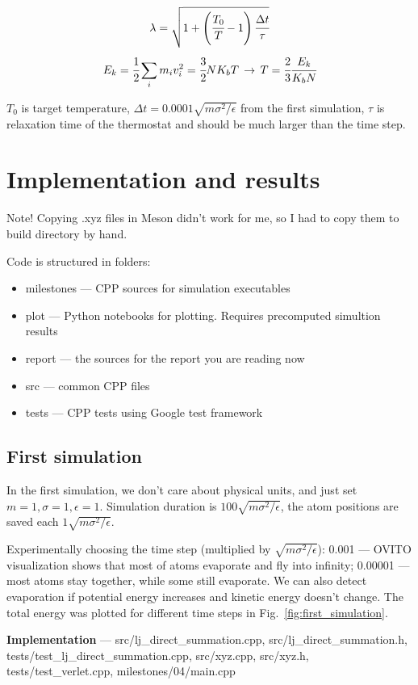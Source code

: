 \documentclass[12pt,a4paper]{article}
\newcommand{\infers}{\,\to\,}
\begin{document}
\[ \lambda = \sqrt{1 + \left(\cfrac{T_0}{T}-1 \right) \cfrac{\Delta t}{\tau} }  \]
\[ E_k = \cfrac{1}{2} \sum_i m_i v_i^2 = \cfrac{3}{2} N K_b T \infers T = \cfrac{2}{3} \cfrac{E_k}{K_b N} \]

\(T_0\) is target temperature, \(\Delta t = 0.0001 \sqrt{m\sigma^2 / \epsilon} \) from the first simulation, \( \tau \) is relaxation time of the thermostat and should be much larger than the time step.

\section{Implementation and results}
\label{implementation}

Note! Copying .xyz files in Meson didn't work for me, so I had to copy them to build directory by hand.

Code is structured in folders:
\begin{itemize}
	\item milestones --- CPP sources for simulation executables
	\item plot --- Python notebooks for plotting. Requires precomputed simultion results
	\item report --- the sources for the report you are reading now
	\item src --- common CPP files
	\item tests --- CPP tests using Google test framework
\end{itemize}

\subsection*{First simulation}
In the first simulation, we don't care about physical units, and just set \( m=1, \sigma=1, \epsilon=1 \). Simulation duration is \( 100 \sqrt{m\sigma^2 / \epsilon} \), the atom positions are saved each \( 1 \sqrt{m\sigma^2 / \epsilon} \).  

Experimentally choosing the time step (multiplied by \( \sqrt{m\sigma^2 / \epsilon} \)): 0.001 --- OVITO visualization shows that most of atoms evaporate and fly into infinity; 0.00001 --- most atoms stay together, while some still evaporate. We can also detect evaporation if potential energy increases and kinetic energy doesn't change. The total energy was plotted for different time steps in Fig.~\ref{fig:first_simulation}.

{\bf Implementation} --- src/lj\_direct\_summation.cpp, src/lj\_direct\_summation.h, tests/test\_lj\_direct\_summation.cpp, src/xyz.cpp, src/xyz.h, tests/test\_verlet.cpp, milestones/04/main.cpp
\end{document}
